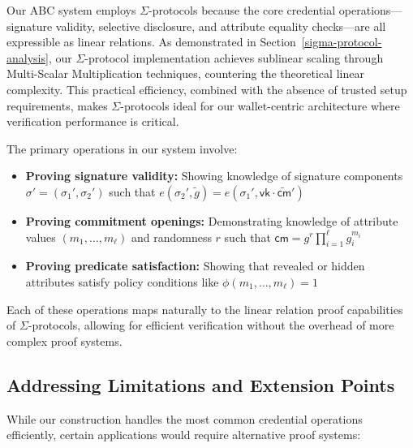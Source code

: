 Our ABC system employs $\Sigma$-protocols because the core credential operations—signature validity, selective disclosure, and attribute equality checks—are all expressible as linear relations. As demonstrated in Section~\ref{sigma-protocol-analysis}, our $\Sigma$-protocol implementation achieves sublinear scaling through Multi-Scalar Multiplication techniques, countering the theoretical linear complexity. This practical efficiency, combined with the absence of trusted setup requirements, makes $\Sigma$-protocols ideal for our wallet-centric architecture where verification performance is critical.

The primary operations in our system involve:

\begin{itemize}
    \item \textbf{Proving signature validity:} Showing knowledge of signature components $\sigma' = (\sigma_1', \sigma_2')$ such that $e(\sigma_2', \tilde{g}) = e(\sigma_1', \mathsf{vk} \cdot \widetilde{\mathsf{cm}}')$
    
    \item \textbf{Proving commitment openings:} Demonstrating knowledge of attribute values $(m_1, \ldots, m_\ell)$ and randomness $r$ such that $\mathsf{cm} = g^r \prod_{i=1}^\ell g_i^{m_i}$
    
    \item \textbf{Proving predicate satisfaction:} Showing that revealed or hidden attributes satisfy policy conditions like $\phi(m_1, \ldots, m_\ell) = 1$
\end{itemize}

Each of these operations maps naturally to the linear relation proof capabilities of $\Sigma$-protocols, allowing for efficient verification without the overhead of more complex proof systems.

\subsection{Addressing Limitations and Extension Points}

While our construction handles the most common credential operations efficiently, certain applications would require alternative proof systems:

